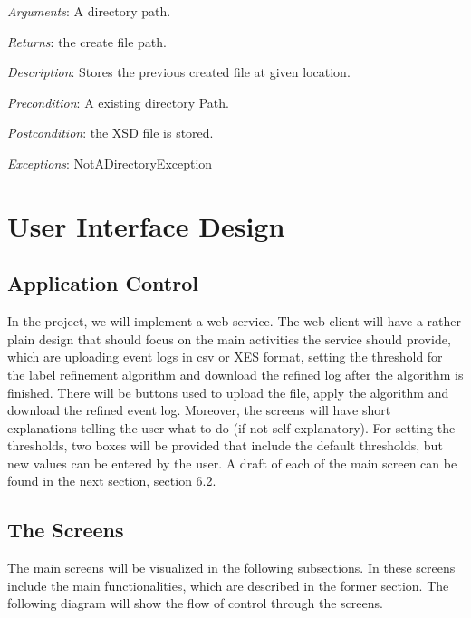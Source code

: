 \documentclass[notitlepage]{article}
\begin{document}
\begin{flushleft}
\textit{Arguments}: A directory path.

\textit{Returns}: the create file path.

\textit{Description}: Stores the previous created file at given location.

\textit{Precondition}: A existing directory Path.

\textit{Postcondition}: the XSD file is stored.

\textit{Exceptions}: NotADirectoryException
\par
\endgroup





\section{User Interface Design}
\subsection{Application Control}

In the project, we will implement a web service. The web client will have a rather plain design that should focus on the main activities the service should provide, which are uploading event logs in csv or XES format, setting the threshold for the label refinement algorithm and download the refined log after the algorithm is finished. There will be buttons used to upload the file, apply the algorithm and download the refined event log. Moreover, the screens will have short explanations telling the user what to do (if not self-explanatory). For setting the thresholds, two boxes will be provided that include the default thresholds, but new values can be entered by the user. A draft of each of the main screen can be found in the next section, section 6.2.

\subsection{The Screens}

The main screens will be visualized in the following subsections. In these screens include the main functionalities, which are described in the former section. The following diagram will show the flow of control through the screens.  


\end{flushleft}
\end{document}
